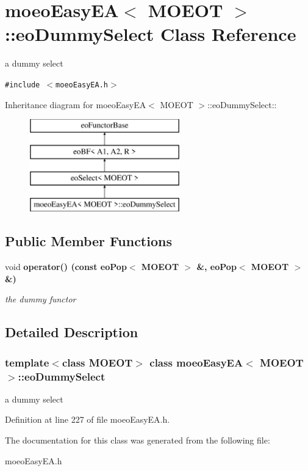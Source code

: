 \section{moeo\-Easy\-EA$<$ MOEOT $>$::eo\-Dummy\-Select Class Reference}
\label{classmoeoEasyEA_1_1eoDummySelect}
a dummy select  


{\tt \#include $<$moeo\-Easy\-EA.h$>$}

Inheritance diagram for moeo\-Easy\-EA$<$ MOEOT $>$::eo\-Dummy\-Select::\begin{figure}[H]
\begin{center}
\leavevmode
\includegraphics[height=4cm]{classmoeoEasyEA_1_1eoDummySelect}
\end{center}
\end{figure}
\subsection*{Public Member Functions}
\begin{CompactItemize}
\item 
void \bf{operator()} (const \bf{eo\-Pop}$<$ MOEOT $>$ \&, \bf{eo\-Pop}$<$ MOEOT $>$ \&)\label{classmoeoEasyEA_1_1eoDummySelect_32207d2ed997aa90ba9f32f5625b63d6}

\begin{CompactList}\small\item\em the dummy functor \item\end{CompactList}\end{CompactItemize}


\subsection{Detailed Description}
\subsubsection*{template$<$class MOEOT$>$ class moeo\-Easy\-EA$<$ MOEOT $>$::eo\-Dummy\-Select}

a dummy select 



Definition at line 227 of file moeo\-Easy\-EA.h.

The documentation for this class was generated from the following file:\begin{CompactItemize}
\item 
moeo\-Easy\-EA.h\end{CompactItemize}
